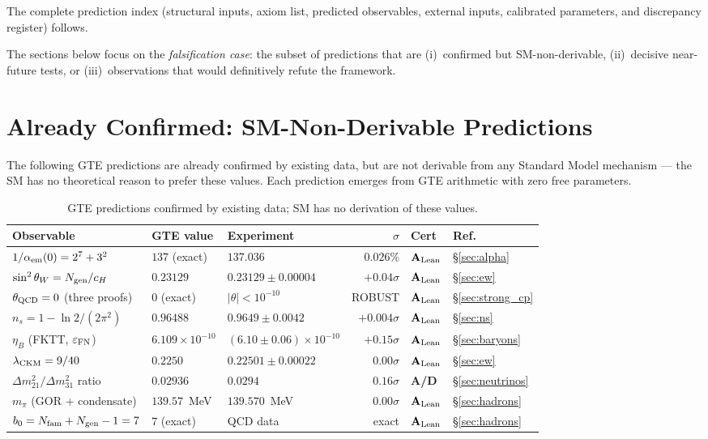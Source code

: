 \documentclass[11pt,openany]{book}
\theoremstyle{remark}
\newcommand{\CatAL}{\ensuremath{\textbf{A}_{\rm Lean}}}
\newcommand{\CatAD}{\textbf{A/D}}
\begin{document}
\begin{appendices}
The complete prediction index (structural inputs, axiom list, predicted observables,
external inputs, calibrated parameters, and discrepancy register) follows.



The sections below focus on the \emph{falsification case}: the subset of predictions that
are (i)~confirmed but SM-non-derivable, (ii)~decisive near-future tests, or
(iii)~observations that would definitively refute the framework.

\section*{Already Confirmed: SM-Non-Derivable Predictions}

The following GTE predictions are already confirmed by existing data, but are not
derivable from any Standard Model mechanism — the SM has no theoretical reason to
prefer these values.
Each prediction emerges from GTE arithmetic with zero free parameters.

\begin{table}[htbp]
\centering
\caption{GTE predictions confirmed by existing data; SM has no derivation of these values.}
\label{tab:appf_confirmed}
\renewcommand{\arraystretch}{1.3}
\begin{tabular}{@{}P{4.8cm}P{2.6cm}P{3.0cm}rll@{}}
\toprule
\textbf{Observable} & \textbf{GTE value} & \textbf{Experiment} & \textbf{$\sigma$} & \textbf{Cert} & \textbf{Ref.} \\
\midrule
$1/\alpha_{\rm em}(0) = 2^7 + 3^2$ & $137$ (exact) & $137.036$ & $0.026\%$ & \CatAL & \S\ref{sec:alpha} \\
$\sin^2\theta_W = N_{\rm gen}/c_H$ & $0.23129$ & $0.23129\pm0.00004$ & $+0.04\sigma$ & \CatAL & \S\ref{sec:ew} \\
$\theta_{\rm QCD} = 0$ (three proofs) & $0$ (exact) & $|\theta|<10^{-10}$ & ROBUST & \CatAL & \S\ref{sec:strong_cp} \\
$n_s = 1 - \ln 2/(2\pi^2)$ & $0.96488$ & $0.9649\pm0.0042$ & $+0.004\sigma$ & \CatAL & \S\ref{sec:ns} \\
$\eta_B$ (FKTT, $\varepsilon_{\rm FN}$) & $6.109\times10^{-10}$ & $(6.10\pm0.06)\times10^{-10}$ & $+0.15\sigma$ & \CatAL & \S\ref{sec:baryons} \\
$\lambda_{\rm CKM} = 9/40$ & $0.2250$ & $0.22501\pm0.00022$ & $0.00\sigma$ & \CatAL & \S\ref{sec:ew} \\
$\Delta m^2_{21}/\Delta m^2_{31}$ ratio & $0.02936$ & $0.0294$ & $0.16\sigma$ & \CatAD & \S\ref{sec:neutrinos} \\
$m_\pi$ (GOR + condensate) & $139.57$~MeV & $139.570$~MeV & $0.00\sigma$ & \CatAL & \S\ref{sec:hadrons} \\
$b_0 = N_{\rm fam}+N_{\rm gen}-1 = 7$ & $7$ (exact) & QCD data & exact & \CatAL & \S\ref{sec:hadrons} \\
\bottomrule
\end{tabular}
\end{table}


\end{appendices}
\end{document}
